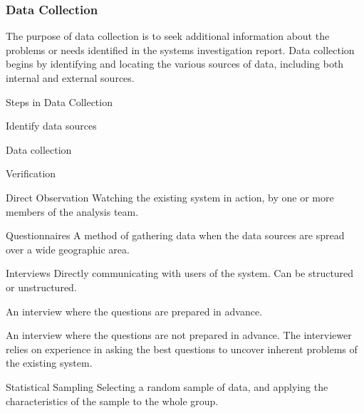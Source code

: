 \documentclass[\main/notes.tex]{subfiles}
\begin{document}
				\subsubsection{Data Collection}
					The purpose of data collection is to seek additional information about the problems or needs identified in the systems investigation report. Data collection begins by identifying and locating the various sources of data, including both internal and external sources.
					\begin{sidenote}{Steps in Data Collection}
						\begin{center}
							\begin{enumerate*}[nosep, itemjoin={\quad}]
								\item Identify data sources
								\item Data collection
								\item Verification
							\end{enumerate*}
						\end{center}
					\end{sidenote}
					\begin{definition}{Direct Observation}
						Watching the existing system in action, by one or more members of the analysis team.
					\end{definition}
					\begin{definition}{Questionnaires}
						A method of gathering data when the data sources are spread over a wide geographic area.
					\end{definition}
					\begin{definition}{Interviews}
						Directly communicating with users of the system. Can be structured or unstructured.
						\begin{description}[nosep]
							\item[Structured Interview] An interview where the questions are prepared in advance.
							\item[Unstructured Interview] An interview where the questions are not prepared in advance. The interviewer relies on experience in asking the best questions to uncover inherent problems of the existing system.
						\end{description}
					\end{definition}
					\begin{definition}{Statistical Sampling}
						Selecting a random sample of data, and applying the characteristics of the sample to the whole group.
					\end{definition}
\end{document}
